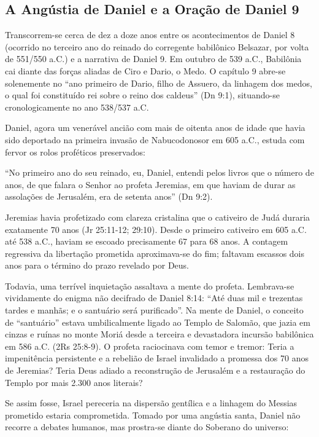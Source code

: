 \subsection{A Angústia de Daniel e a Oração de Daniel 9}


Transcorrem-se cerca de dez a doze anos entre os acontecimentos de Daniel 8 (ocorrido no terceiro ano do reinado do corregente babilônico Belsazar, por volta de 551/550 a.C.) e a narrativa de Daniel 9. Em outubro de 539 a.C., Babilônia cai diante das forças aliadas de Ciro e Dario, o Medo. O capítulo 9 abre-se solenemente no ``ano primeiro de Dario, filho de Assuero, da linhagem dos medos, o qual foi constituído rei sobre o reino dos caldeus'' (Dn 9:1), situando-se cronologicamente no ano 538/537 a.C.

Daniel, agora um venerável ancião com mais de oitenta anos de idade que havia sido deportado na primeira invasão de Nabucodonosor em 605 a.C., estuda com fervor os rolos proféticos preservados:

``No primeiro ano do seu reinado, eu, Daniel, entendi pelos livros que o número de anos, de que falara o Senhor ao profeta Jeremias, em que haviam de durar as assolações de Jerusalém, era de setenta anos'' (Dn 9:2).

Jeremias havia profetizado com clareza cristalina que o cativeiro de Judá duraria exatamente 70 anos (Jr 25:11-12; 29:10). Desde o primeiro cativeiro em 605 a.C. até 538 a.C., haviam se escoado precisamente 67 para 68 anos. A contagem regressiva da libertação prometida aproximava-se do fim; faltavam escassos dois anos para o término do prazo revelado por Deus.

Todavia, uma terrível inquietação assaltava a mente do profeta. Lembrava-se vividamente do enigma não decifrado de Daniel 8:14: ``Até duas mil e trezentas tardes e manhãs; e o santuário será purificado''. Na mente de Daniel, o conceito de ``santuário'' estava umbilicalmente ligado ao Templo de Salomão, que jazia em cinzas e ruínas no monte Moriá desde a terceira e devastadora incursão babilônica em 586 a.C. (2Rs 25:8-9). O profeta raciocinava com temor e tremor: Teria a impenitência persistente e a rebelião de Israel invalidado a promessa dos 70 anos de Jeremias? Teria Deus adiado a reconstrução de Jerusalém e a restauração do Templo por mais 2.300 anos literais?

Se assim fosse, Israel pereceria na dispersão gentílica e a linhagem do Messias prometido estaria comprometida. Tomado por uma angústia santa, Daniel não recorre a debates humanos, mas prostra-se diante do Soberano do universo:

